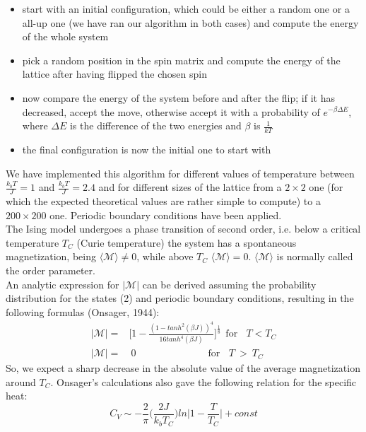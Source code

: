 \documentclass[10pt,a4paper,titlepage]{article}
\begin{document}
\begin{itemize}
\item start with an initial configuration, which could be either a random one or a all-up one (we have ran our algorithm in both cases) and compute the energy of the whole system
\item pick a random position in the spin matrix and compute the energy of the lattice after having flipped the chosen spin
\item now compare the energy of the system before and after the flip; if it has decreased, accept the move, otherwise accept it with a probability of $e^{-\beta \Delta E}$, where $\Delta E$ is the difference of the two energies and $\beta$ is $\frac{1}{kT}$
\item the final configuration is now the initial one to start with
\end{itemize}
We have implemented this algorithm for different values of temperature between $\frac{k_{b}T}{J} = 1$ and $\frac{k_{b}T}{J} = 2.4$ and for different sizes of the lattice from a $2\times 2$ one (for which the expected theoretical values are rather simple to compute) to a $200\times 200$ one. Periodic boundary conditions have been applied.\\
The Ising model undergoes a phase transition of second order, i.e. below a critical temperature $T_{C}$ (Curie temperature) the system has a spontaneous magnetization, being $\langle \mathscr{M}\rangle \neq 0$, while above $T_{C}$ $\langle \mathscr{M}\rangle = 0$. $\langle \mathscr{M}\rangle$ is normally called the order parameter. 
\\An analytic expression for $|\mathscr{M}|$ can be derived assuming the probability distribution for the states (2) and periodic boundary conditions, resulting in the following formulas (Onsager, 1944):
\begin{equation}\begin{split}
|\mathscr{M}|=&\bigg[1-\frac{(1-tanh^{2}(\beta J))^{4}}{16tanh^{4}(\beta J)}\bigg]^{\frac{1}{8}}~~ \mbox{for}~~~ \ T<T_{C}\\
|\mathscr{M}|=&\ 0 \ ~~~~~~~~~~~~~~~~~~~~~~~~~~~~~~~~ \mbox{for}~~~ \ T \ > \ T_{C}
\end{split}\end{equation}
So, we expect a sharp decrease in the absolute value of the average magnetization around $T_{C}$.
Onsager's calculations also gave the following relation for the specific heat:
\begin{equation}
C_{V} \sim -\frac{2}{\pi} \bigg(\frac{2J}{k_{b}T_{C}}\bigg) ln \Bigg|1-\frac{T}{T_{C}} \Bigg| + const
\end{equation}
\end{document}
